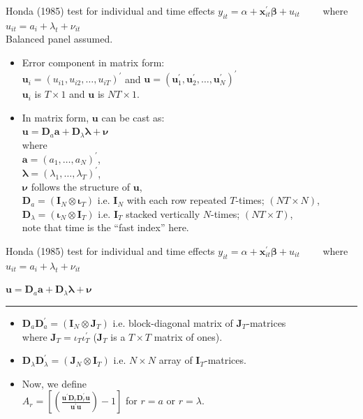 \documentclass[usenames,dvipsnames]{beamer}
\begin{document}
\begin{frame}{Honda (1985) test for individual and time effects}
\small
$y_{it} = \alpha + \bm{x}^{\prime}_{it} \bm{\beta} + u_{it} \qquad$    where $u_{it}=a_i + \lambda_t + \nu_{it}$\\ \medskip Balanced panel assumed. \bigskip
\begin{itemize}
    \item Error component in matrix form: \\ \smallskip
    $\bm{u}_i = \left( u_{i1}, u_{i2}, \dots, u_{iT} \right)^{\prime}$ and $\bm{u} = \left( \bm{u}_1^{\prime}, \bm{u}_2^{\prime}, \dots, \bm{u}_N^{\prime} \right)^{\prime}$ \\ \smallskip
    $\bm{u}_i$ is $T \times 1$ and $\bm{u}$ is $NT \times 1$.
    \medskip
    \item In matrix form, $\bm{u}$ can be cast as: \\
    $\bm{u} = \bm{D}_{a} \bm{a} + \bm{D}_{\lambda} \bm{\lambda} + \bm{\nu}$ \\ \smallskip
    where \\$\bm{a} = (a_1, \dots, a_N)^{\prime}$, \\$\bm{\lambda} = (\lambda_1, \dots, \lambda_T)^{\prime}$, \\$\bm{\nu}$ follows the structure of $\bm{u}$,\\
    $\bm{D}_{a} = (\bm{I}_N \otimes \bm{\iota}_T)$ i.e. $\bm{I}_N$ with each row repeated $T$-times; $(NT \times N)$, \\
    $\bm{D}_{\lambda} = ( \bm{\iota}_N \otimes \bm{I}_T )$ i.e. $\bm{I}_T$ stacked vertically $N$-times; $(NT \times T)$, \\ 
    note that time is the ``fast index'' here.
    \end{itemize}
\end{frame}
\begin{frame}{Honda (1985) test for individual and time effects}
$y_{it} = \alpha + \bm{x}^{\prime}_{it} \bm{\beta} + u_{it} \qquad$    where $u_{it}=a_i + \lambda_t + \nu_{it}$\\ \medskip

$\bm{u} = \bm{D}_{a} \bm{a} + \bm{D}_{\lambda} \bm{\lambda} + \bm{\nu}$ \\ \vspace{0.3cm} \hrule \bigskip
\begin{itemize}
    \item $\bm{D}_{a} \bm{D}_{a}^{\prime} = \left(\bm{I}_N \otimes \bm{J}_T \right)$ i.e. block-diagonal matrix of $\bm{J}_T$-matrices \\where $\bm{J}_T=\iota_T \iota_T^{\prime}$  ($\bm{J}_T$ is a $T \times T$ matrix of ones).
    \medskip
    \item $\bm{D}_{\lambda} \bm{D}_{\lambda}^{\prime} = \left(\bm{J}_N \otimes \bm{I}_T   \right)$ i.e. $N\times N$ array of $\bm{I}_T$-matrices.
    \medskip
    \item Now, we define\\ \medskip
    $A_r = \left[ \left( \frac{\bm{u}^{\prime}\bm{D}_r \bm{D}_r^{\prime} \bm{u}}{\bm{u}^{\prime}\bm{u}} \right) - 1 \right]$ for $r=a$ or $r=\lambda$.
    \end{itemize}
\end{frame}
\end{document}

